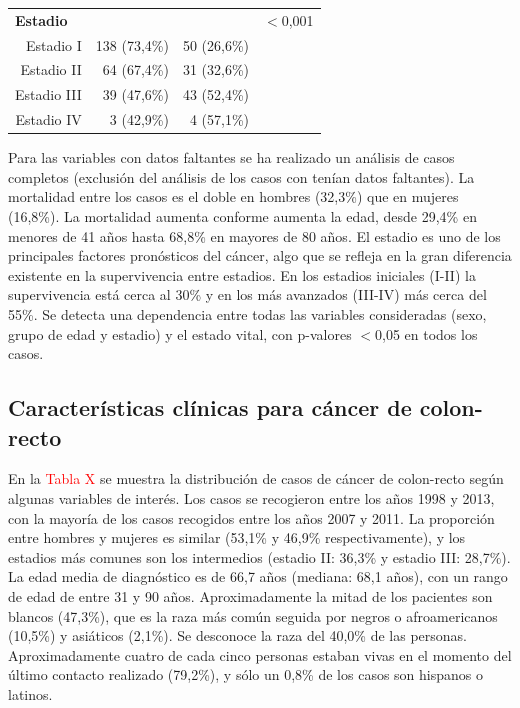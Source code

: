 \begin{table}[H]
\begin{tabular}{rrrc}
		\multicolumn{1}{l}{\textbf{Estadio}}           &                           &                             & $<$0,001                         \\
		Estadio I                                      & 138 (73,4\%)              & 50 (26,6\%)                 &                                          \\
		Estadio II                                     & 64 (67,4\%)               & 31 (32,6\%)                 &                                          \\
		Estadio III                                    & 39 (47,6\%)               & 43 (52,4\%)                 &                                          \\
		Estadio IV                                     & 3 (42,9\%)                & 4 (57,1\%)                  &                                          \\ \hline
	\end{tabular}
\end{table}

Para las variables con datos faltantes se ha realizado un análisis de casos completos (exclusión del análisis de los casos con tenían datos faltantes).  La mortalidad entre los casos es el doble en hombres (32,3\%) que en mujeres (16,8\%). La mortalidad aumenta conforme aumenta la edad, desde 29,4\% en menores de 41 años hasta 68,8\% en mayores de 80 años. El estadio es uno de los principales factores pronósticos del cáncer, algo que se refleja en la gran diferencia existente en la supervivencia entre estadios. En los estadios iniciales (I-II) la supervivencia está cerca al 30\% y en los más avanzados (III-IV) más cerca del 55\%. Se detecta una dependencia entre todas las variables consideradas (sexo, grupo de edad y estadio)  y el estado vital, con p-valores $<$0,05 en todos los casos.

\subsection{Características clínicas para cáncer de colon-recto}

En la \textcolor{red}{Tabla X} se muestra  la distribución de casos de cáncer de colon-recto según algunas variables de interés. Los casos se recogieron entre los años 1998 y 2013, con la mayoría de los casos recogidos entre los años 2007 y 2011. La proporción entre hombres y mujeres es similar (53,1\% y 46,9\% respectivamente), y los estadios más comunes son los intermedios (estadio II: 36,3\% y estadio III: 28,7\%). La edad media de diagnóstico es de 66,7 años (mediana: 68,1 años), con un rango de edad de entre 31 y 90 años. Aproximadamente la mitad de los pacientes son blancos (47,3\%), que es la raza más común seguida por negros o afroamericanos (10,5\%) y asiáticos (2,1\%). Se desconoce la raza del 40,0\% de las personas. Aproximadamente cuatro de cada cinco personas estaban vivas en el momento del último contacto realizado (79,2\%), y sólo un 0,8\% de los casos son hispanos o latinos.\\

